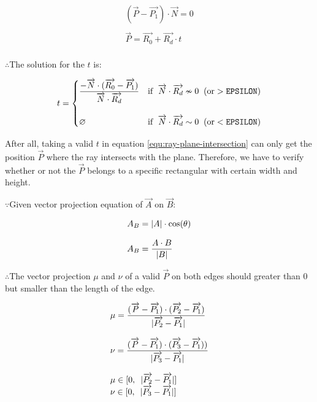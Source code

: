 \begin{equation}
\label{equ:ray-plane-intersection}
\begin{array}{lr}
(\overrightarrow{P} - \overrightarrow{P_1}) \cdot \overrightarrow{N} = 0\\\\
\overrightarrow{P} = \overrightarrow{R_0} + \overrightarrow{R_d} \cdot t\\
\end{array}
\end{equation}

$\therefore$\;\;\;\;The solution for the $t$ is:

\[
t =
\begin{cases}
\dfrac{-\overrightarrow{N} \cdot (\overrightarrow{R_0} - \overrightarrow{P_1})}{\overrightarrow{N} \cdot \overrightarrow{R_d}} & \text{if }\;\overrightarrow{N} \cdot \overrightarrow{R_d} \nsim 0\;\;(\text{or} > \texttt{EPSILON})\\\\
\varnothing & \text{if }\;\overrightarrow{N} \cdot \overrightarrow{R_d} \sim 0\;\;(\text{or} < \texttt{EPSILON})\\
\end{cases}
\]

After all, taking a valid $t$ in equation \ref{equ:ray-plane-intersection} can only get the position $\overrightarrow{P}$ where the ray intersects with the plane. Therefore, we have to verify whether or not the $\overrightarrow{P}$ belongs to a specific rectangular with certain width and height. 

$\because$\;\;\;\;Given vector projection equation of $\overrightarrow{A}$ on $\overrightarrow{B}$:

\begin{equation}
\label{equ:vector-projection}
\begin{array}{lr}
A_{B} = \lvert A \rvert \cdot \cos(\theta)\\\\
A_{B} = \dfrac{A \cdot B}{\lvert B \rvert}\\
\end{array}
\end{equation}

$\therefore$\;\;\;\;The vector projection $\mu$ and $\nu$ of a valid $\overrightarrow{P}$ on both edges should greater than $0$ but smaller than the length of the edge.

\[
\begin{array}{lr}
\mu = \dfrac{(\overrightarrow{P} - \overrightarrow{P_1}) \cdot (\overrightarrow{P_2} - \overrightarrow{P_1})}{\enspace\lvert \overrightarrow{P_2} - \overrightarrow{P_1} \rvert}\\\\
\nu = \dfrac{(\overrightarrow{P} - \overrightarrow{P_1}) \cdot (\overrightarrow{P_3} - \overrightarrow{P_1}))}{\lvert \overrightarrow{P_3} - \overrightarrow{P_1} \rvert}\\\\
\mu \in [0,\enspace\lvert \overrightarrow{P_2} - \overrightarrow{P_1} \rvert]\\
\nu \in [0,\enspace\lvert \overrightarrow{P_3} - \overrightarrow{P_1} \rvert]\\
\end{array}
\]


